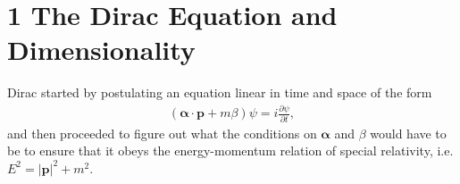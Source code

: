 \documentclass[working, oneside]{../../../Preambles/tuftebook}
\begin{document}
\let\cleardoublepage\clearpage
\thispagestyle{fancy}
\chapter{1 The Dirac Equation and Dimensionality}
\begin{exercise}[1]
Dirac started by postulating an equation linear in time and space of the form
\begin{align}
(\boldsymbol{\alpha} \cdot \mathbf{p} + m\beta)\psi = i \frac{\partial \psi}{\partial t}, \tag{1}
\end{align}
and then proceeded to figure out what the conditions on $\boldsymbol{\alpha}$ and $\beta$ would have to be to ensure that it obeys the energy-momentum relation of special relativity, i.e. $E^2 = |\mathbf{p}|^2 + m^2$.
\end{exercise}
\end{document}
